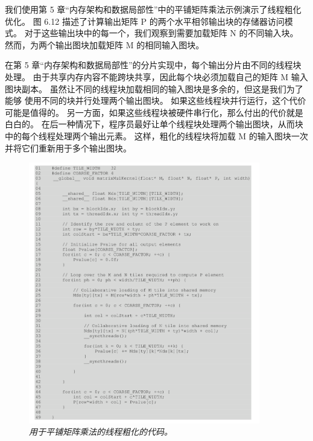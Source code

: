 我们使用第 5 章“内存架构和数据局部性”中的平铺矩阵乘法示例演示了线程粗化优化。 
图 6.12 描述了计算输出矩阵 P 的两个水平相邻输出块的存储器访问模式。
对于这些输出块中的每一个，我们观察到需要加载矩阵 N 的不同输入块。 然而，为两个输出图块加载矩阵 M 的相同输入图块。

在第 5 章“内存架构和数据局部性”的分片实现中，每个输出分片由不同的线程块处理。 
由于共享内存内容不能跨块共享，因此每个块必须加载自己的矩阵 M 输入图块副本。
虽然让不同的线程块加载相同的输入图块是多余的，但这是我们为了能够 使用不同的块并行处理两个输出图块。 
如果这些线程块并行运行，这个代价可能是值得的。 另一方面，如果这些线程块被硬件串行化，那么付出的代价就是白白的。 
在后一种情况下，程序员最好让单个线程块处理两个输出图块，从而块中的每个线程处理两个输出元素。 
这样，粗化的线程块将加载 M 的输入图块一次并将它们重新用于多个输出图块。

\begin{figure}[H]
	\centering
	\includegraphics[width=0.9\textwidth]{figs/F6.13.png}
	\caption{\textit{用于平铺矩阵乘法的线程粗化的代码。}}
\end{figure}


